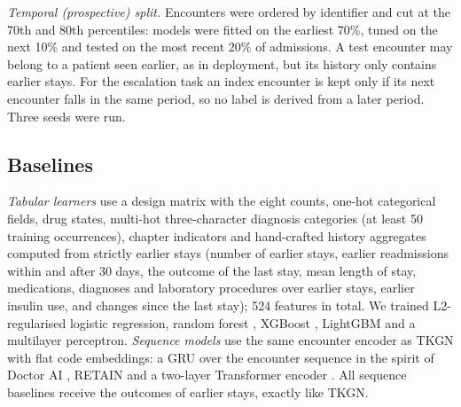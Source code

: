 \documentclass[preprint,12pt,authoryear]{elsarticle}
\begin{document}
\emph{Temporal (prospective) split.} Encounters were ordered by identifier
and cut at the 70th and 80th percentiles: models were fitted on the
earliest 70\%, tuned on the next 10\% and tested on the most recent 20\%
of admissions. A test encounter may belong to a patient seen earlier, as
in deployment, but its history only contains earlier stays. For the
escalation task an index encounter is kept only if its next encounter
falls in the same period, so no label is derived from a later period.
Three seeds were run.

\subsection{Baselines}
\label{sec:baselines}
\emph{Tabular learners} use a design matrix with the eight counts,
one-hot categorical fields, drug states, multi-hot three-character
diagnosis categories (at least 50 training occurrences), chapter
indicators and hand-crafted history aggregates computed from strictly
earlier stays (number of earlier stays, earlier readmissions within and
after 30 days, the outcome of the last stay, mean length of stay,
medications, diagnoses and laboratory procedures over earlier stays,
earlier insulin use, and changes since the last stay); 524 features in
total. We trained L2-regularised logistic regression, random forest
\citep{breiman2001}, XGBoost \citep{chen2016xgboost}, LightGBM
\citep{ke2017lightgbm} and a multilayer perceptron. \emph{Sequence
models} use the same encounter encoder as TKGN with flat code embeddings:
a GRU over the encounter sequence in the spirit of Doctor AI
\citep{choi2016doctorai}, RETAIN \citep{choi2016retain} and a two-layer
Transformer encoder \citep{vaswani2017}. All sequence baselines receive
the outcomes of earlier stays, exactly like TKGN.
\end{document}
